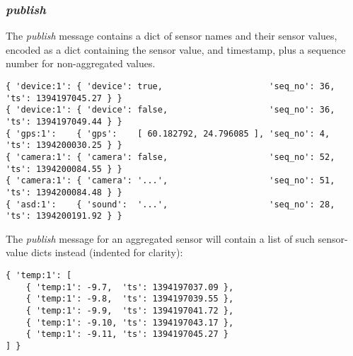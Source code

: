 \documentclass[a4paper]{article}
\begin{document}
\subsubsection{\emph{publish}}

The \emph{publish} message contains a dict of sensor names and their sensor values, encoded as a dict containing the sensor value, and timestamp, plus a sequence number for non-aggregated values.
\begin{verbatim}
{ 'device:1': { 'device': true,                     'seq_no': 36, 'ts': 1394197045.27 } }
{ 'device:1': { 'device': false,                    'seq_no': 36, 'ts': 1394197049.44 } }
{ 'gps:1':    { 'gps':    [ 60.182792, 24.796085 ], 'seq_no': 4,  'ts': 1394200030.25 } }
{ 'camera:1': { 'camera': false,                    'seq_no': 52, 'ts': 1394200084.55 } }
{ 'camera:1': { 'camera': '...',                    'seq_no': 51, 'ts': 1394200084.48 } }
{ 'asd:1':    { 'sound':  '...',                    'seq_no': 28, 'ts': 1394200191.92 } }
\end{verbatim}

The \emph{publish} message for an aggregated sensor will contain a list of such sensor-value dicts instead (indented for clarity):
\begin{verbatim}
{ 'temp:1': [
    { 'temp:1': -9.7,  'ts': 1394197037.09 },
    { 'temp:1': -9.8,  'ts': 1394197039.55 },
    { 'temp:1': -9.9,  'ts': 1394197041.72 },
    { 'temp:1': -9.10, 'ts': 1394197043.17 },
    { 'temp:1': -9.11, 'ts': 1394197045.27 }
] }
\end{verbatim}
\end{document}
